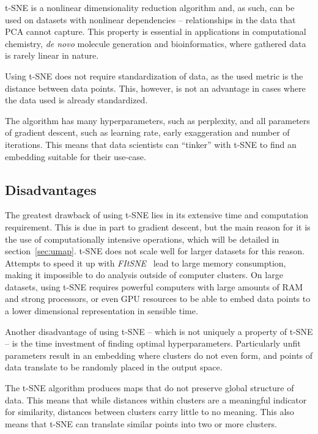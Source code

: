 t-SNE is a nonlinear dimensionality reduction algorithm and, as such, can be used on datasets with nonlinear dependencies -- relationships in the data that PCA cannot capture. This property is essential in applications in computational chemistry, \textit{de novo} molecule generation and bioinformatics, where gathered data is rarely linear in nature.

Using t-SNE does not require standardization of data, as the used metric is the distance between data points. This, however, is not an advantage in cases where the data used is already standardized.

The algorithm has many hyperparameters, such as perplexity, and all parameters of gradient descent, such as learning rate, early exaggeration and number of iterations. This means that data scientists can ``tinker'' with t-SNE to find an embedding suitable for their use-case.

\subsection{Disadvantages}

The greatest drawback of using t-SNE lies in its extensive time and computation requirement. This is due in part to gradient descent, but the main reason for it is the use of computationally intensive operations, which will be detailed in section~\ref{sec:umap}. t-SNE does not scale well for larger datasets for this reason. Attempts to speed it up with \textit{FItSNE}~\cite{bib:tsne:FItSNE} lead to large memory consumption, making it impossible to do analysis outside of computer clusters. On large datasets, using t-SNE requires powerful computers with large amounts of RAM and strong processors, or even GPU resources to be able to embed data points to a lower dimensional representation in sensible time.

Another disadvantage of using t-SNE -- which is not uniquely a property of t-SNE -- is the time investment of finding optimal hyperparameters. Particularly unfit parameters result in an embedding where clusters do not even form, and points of data translate to be randomly placed in the output space.~\cite{bib:distill}

The t-SNE algorithm produces maps that do not preserve global structure of data. This means that while distances within clusters are a meaningful indicator for similarity, distances between clusters carry little to no meaning. This also means that t-SNE can translate similar points into two or more clusters.

